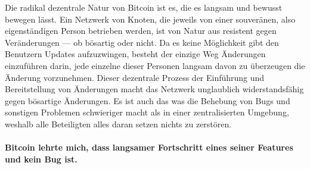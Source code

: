Die radikal dezentrale Natur von Bitcoin ist es, die es langsam und bewusst
bewegen lässt. Ein Netzwerk von Knoten, die jeweils von einer souveränen, also
eigenständigen Person betrieben werden, ist von Natur aus resistent gegen
Veränderungen — ob bösartig oder nicht. Da es keine Möglichkeit gibt den
Benutzern Updates aufzuzwingen, besteht der einzige Weg Änderungen einzuführen
darin, jede einzelne dieser Personen langsam davon zu überzeugen die Änderung
vorzunehmen. Dieser dezentrale Prozess der Einführung und Bereitstellung von
Änderungen macht das Netzwerk unglaublich widerstandsfähig gegen bösartige
Änderungen. Es ist auch das was die Behebung von Bugs und sonstigen Problemen
schwieriger macht als in einer zentralisierten Umgebung, weshalb alle
Beteiligten alles daran setzen nichts zu zerstören.

\paragraph{Bitcoin lehrte mich, dass langsamer Fortschritt eines seiner Features
und kein Bug ist.}

%
%
%
%
%
%
%
